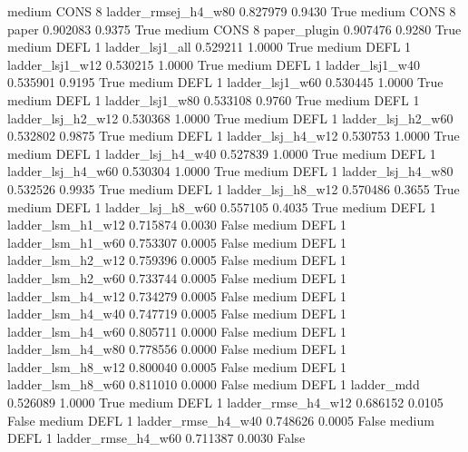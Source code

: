     medium     CONS                 8 ladder_rmsej_h4_w80   0.827979      0.9430    True
    medium     CONS                 8               paper   0.902083      0.9375    True
    medium     CONS                 8        paper_plugin   0.907476      0.9280    True
    medium     DEFL                 1     ladder_lsj1_all   0.529211      1.0000    True
    medium     DEFL                 1     ladder_lsj1_w12   0.530215      1.0000    True
    medium     DEFL                 1     ladder_lsj1_w40   0.535901      0.9195    True
    medium     DEFL                 1     ladder_lsj1_w60   0.530445      1.0000    True
    medium     DEFL                 1     ladder_lsj1_w80   0.533108      0.9760    True
    medium     DEFL                 1   ladder_lsj_h2_w12   0.530368      1.0000    True
    medium     DEFL                 1   ladder_lsj_h2_w60   0.532802      0.9875    True
    medium     DEFL                 1   ladder_lsj_h4_w12   0.530753      1.0000    True
    medium     DEFL                 1   ladder_lsj_h4_w40   0.527839      1.0000    True
    medium     DEFL                 1   ladder_lsj_h4_w60   0.530304      1.0000    True
    medium     DEFL                 1   ladder_lsj_h4_w80   0.532526      0.9935    True
    medium     DEFL                 1   ladder_lsj_h8_w12   0.570486      0.3655    True
    medium     DEFL                 1   ladder_lsj_h8_w60   0.557105      0.4035    True
    medium     DEFL                 1   ladder_lsm_h1_w12   0.715874      0.0030   False
    medium     DEFL                 1   ladder_lsm_h1_w60   0.753307      0.0005   False
    medium     DEFL                 1   ladder_lsm_h2_w12   0.759396      0.0005   False
    medium     DEFL                 1   ladder_lsm_h2_w60   0.733744      0.0005   False
    medium     DEFL                 1   ladder_lsm_h4_w12   0.734279      0.0005   False
    medium     DEFL                 1   ladder_lsm_h4_w40   0.747719      0.0005   False
    medium     DEFL                 1   ladder_lsm_h4_w60   0.805711      0.0000   False
    medium     DEFL                 1   ladder_lsm_h4_w80   0.778556      0.0000   False
    medium     DEFL                 1   ladder_lsm_h8_w12   0.800040      0.0005   False
    medium     DEFL                 1   ladder_lsm_h8_w60   0.811010      0.0000   False
    medium     DEFL                 1          ladder_mdd   0.526089      1.0000    True
    medium     DEFL                 1  ladder_rmse_h4_w12   0.686152      0.0105   False
    medium     DEFL                 1  ladder_rmse_h4_w40   0.748626      0.0005   False
    medium     DEFL                 1  ladder_rmse_h4_w60   0.711387      0.0030   False
